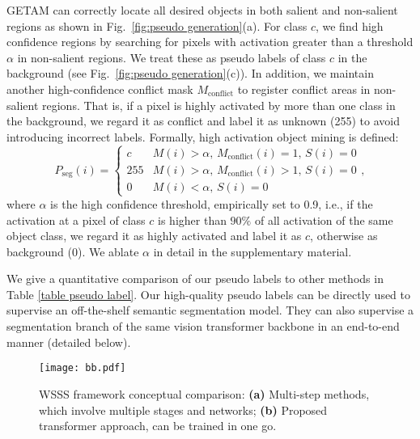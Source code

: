 \documentclass[10pt,twocolumn,letterpaper]{article}
\begin{document}
GETAM can correctly locate all desired objects in both salient and non-salient regions as shown in Fig.~\ref{fig:pseudo generation}(a).
For class $c$, 
we find high confidence regions by searching for pixels with activation greater than a threshold $\alpha$ in non-salient regions. 
We treat these
as pseudo labels of class $c$ in the background (see Fig.~\ref{fig:pseudo generation}(c)). 
In addition, we maintain another high-confidence conflict mask $M_{\text{conflict}}$ to register conflict areas in non-salient regions. That is,
if a pixel is highly activated by more than one class in the background, we regard it as conflict and label it as unknown (255) to avoid introducing incorrect labels. 
Formally, high activation object mining is defined:
\begin{equation}
P_{\text{seg}}(i) = \begin{cases}
     c  &  \text{$M(i) > \alpha$, $M_{\text{conflict}}(i) = 1$,   $S(i) = 0$} \\
    255   &  \text{$M(i) > \alpha$, $M_{\text{conflict}}(i) > 1$,   $S(i) = 0$} \\
    0   &  \text{$M(i) < \alpha$, $S(i) = 0$}
 \end{cases},
\end{equation}
where $\alpha$ is the high confidence threshold, empirically set to 0.9, i.e., if the activation at a pixel of class $c$ is higher than $90\%$ of all activation of the same object class, we regard it as highly activated and label it as $c$, otherwise as background (0). 
We ablate $\alpha$ in detail in the supplementary material.

We give a quantitative comparison of our pseudo labels to other methods in Table \ref{table pseudo label}. Our high-quality pseudo labels can be directly used to supervise an off-the-shelf semantic segmentation model. 
They can also supervise a segmentation branch of the same vision transformer backbone in an end-to-end manner (detailed below).




\begin{figure}[!t]
   \begin{center}
   {\texttt{[image: bb.pdf]}} 
   \end{center}
\caption{WSSS framework conceptual comparison: \textbf{(a)} Multi-step methods, which involve multiple stages and networks; \textbf{(b)} Proposed transformer approach, can be trained in one go. 
}
\label{fig:double bakcward}
\end{figure}
\end{document}
